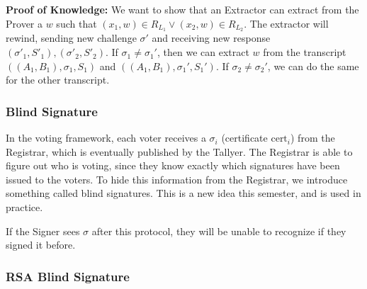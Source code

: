 \textbf{Proof of Knowledge:} We want to show that an Extractor can extract from the Prover a $w$ such that $(x_1, w) \in R_{L_1} \vee (x_2, w) \in R_{L_2}$. The extractor will rewind, sending new challenge $\sigma'$ and receiving new response $(\sigma'_1, S'_1), (\sigma'_2, S'_2)$. If $\sigma_1 \neq \sigma_1'$, then we can extract $w$ from the transcript $((A_1, B_1), \sigma_1, S_1)$ and $((A_1, B_1), \sigma_1', S_1')$. If $\sigma_2 \neq \sigma_2'$, we can do the same for the other transcript.

\subsubsection{Blind Signature}

In the voting framework, each voter receives a $\sigma_i$ (certificate $\text{cert}_i$) from the Registrar, which is eventually published by the Tallyer. The Registrar is able to figure out who is voting, since they know exactly which signatures have been issued to the voters. To hide this information from the Registrar, we introduce something called blind signatures. This is a new idea this semester, and is used in practice.


If the Signer sees $\sigma$ after this protocol, they will be unable to recognize if they signed it before.

\subsubsection{RSA Blind Signature}


